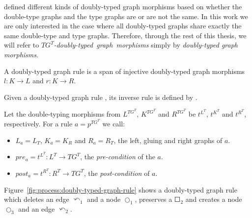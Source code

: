 \begin{remark} \cite{Ribeiro1996} defined different kinds of doubly-typed graph morphisms based on whether the double-type graphs and the type graphs are or are not the same. In this work we are only interested in the case where all doubly-typed graphs share exactly the same double-type and type graphs. Therefore, through the rest of this thesis, we will refer to \mbox{\emph{$TG^T$-doubly-typed graph morphisms}} simply by \emph{doubly-typed graph morphisms}.
\end{remark}


\begin{definition} A doubly-typed graph rule \doublyTypedRule{} is a span of injective doubly-typed graph morphisms $l : K \rightarrow L$ and $r : K \rightarrow R$.


  Given a doubly-typed graph rule \doublyTypedRule{}, its inverse rule is defined by \inverseDoublyTypedRule{}.

  Let the double-typing morphisms from $L^{TG^T}$, $K^{TG^T}$ and $R^{TG^T}$ be $t^{L^T}$, $t^{K^T}$ and $t^{R^T}$, respectively. For a rule $a = p^{TG^T}$ we call:

  \begin{itemize}
    \item $L_a = L_T$, $K_a = K_R$ and $R_a = R_T$, the left, gluing and right graphs of $a$.
    \item $pre_a = t^{L^T} : L^T \rightarrow TG^T$, the \emph{pre-condition} of the $a$.
    \item $post_a = t^{R^T} : R^T \rightarrow TG^T$, the \emph{post-condition} of $a$.
  \end{itemize}
\end{definition}

\begin{example}Figure~\ref{fig:process:doubly-typed-graph-rule} shows a doubly-typed graph rule which deletes an edge $\curvearrowleft_1$ and a node $\Circle_1$, preserves a $\Square_2$ and creates a node $\Circle_3$ and an edge $\curvearrowleft_2$.
\end{example}

